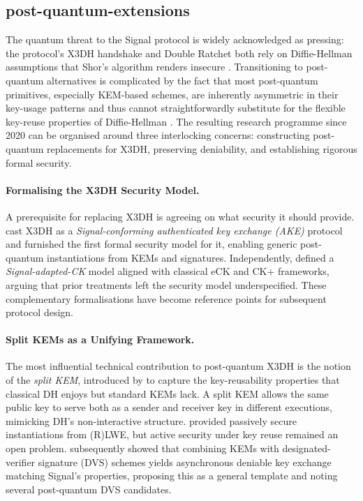 \subsection{post-quantum-extensions}

The quantum threat to the Signal protocol is widely acknowledged as pressing: the protocol's X3DH handshake and Double Ratchet both rely on Diffie-Hellman assumptions that Shor's algorithm renders insecure \parencite{sharma2023,boras2025}. Transitioning to post-quantum alternatives is complicated by the fact that most post-quantum primitives, especially KEM-based schemes, are inherently asymmetric in their key-usage patterns and thus cannot straightforwardly substitute for the flexible key-reuse properties of Diffie-Hellman \parencite{brendel2021}. The resulting research programme since 2020 can be organised around three interlocking concerns: constructing post-quantum replacements for X3DH, preserving deniability, and establishing rigorous formal security.

\paragraph{Formalising the X3DH Security Model.}
A prerequisite for replacing X3DH is agreeing on what security it should provide. \textcite{hashimoto2021} cast X3DH as a \emph{Signal-conforming authenticated key exchange (AKE)} protocol and furnished the first formal security model for it, enabling generic post-quantum instantiations from KEMs and signatures. Independently, \textcite{dobson2022} defined a \emph{Signal-adapted-CK} model aligned with classical eCK and CK+ frameworks, arguing that prior treatments left the security model underspecified. These complementary formalisations have become reference points for subsequent protocol design.

\paragraph{Split KEMs as a Unifying Framework.}
The most influential technical contribution to post-quantum X3DH is the notion of the \emph{split KEM}, introduced by \textcite{brendel2021} to capture the key-reusability properties that classical DH enjoys but standard KEMs lack. A split KEM allows the same public key to serve both as a sender and receiver key in different executions, mimicking DH's non-interactive structure. \textcite{brendel2021} provided passively secure instantiations from (R)LWE, but active security under key reuse remained an open problem. \textcite{brendel2022} subsequently showed that combining KEMs with designated-verifier signature (DVS) schemes yields asynchronous deniable key exchange matching Signal's properties, proposing this as a general template and noting several post-quantum DVS candidates.

